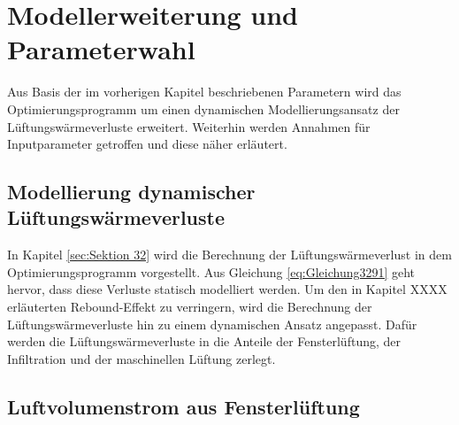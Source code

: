 \chapter{Modellerweiterung und Parameterwahl}

Aus Basis der im vorherigen Kapitel beschriebenen Parametern wird das Optimierungsprogramm um einen dynamischen Modellierungsansatz der Lüftungswärmeverluste erweitert.
Weiterhin werden Annahmen für Inputparameter getroffen und diese näher erläutert.

\section{Modellierung dynamischer Lüftungswärmeverluste}
\label{sec:Sektion 51}

In Kapitel \ref{sec:Sektion 32} wird die Berechnung der Lüftungswärmeverlust in dem Optimierungsprogramm vorgestellt.
Aus Gleichung \ref{eq:Gleichung3291} geht hervor, dass diese Verluste statisch modelliert werden.
Um den in Kapitel XXXX erläuterten Rebound-Effekt zu verringern, wird die Berechnung der Lüftungswärmeverluste hin zu einem dynamischen Ansatz angepasst.
Dafür werden die Lüftungswärmeverluste in die Anteile der Fensterlüftung, der Infiltration und der maschinellen Lüftung zerlegt.

\section*{Luftvolumenstrom aus Fensterlüftung}

